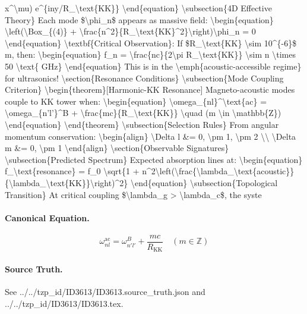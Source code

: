 x\textasciicircum{}\textbackslash{}mu) e\textasciicircum{}\{iny/R\_\textbackslash{}text\{KK\}\} \textbackslash{}end\{equation\} \textbackslash{}subsection\{4D Effective Theory\} Each mode \$\textbackslash{}phi\_n\$ appears as massive field: \textbackslash{}begin\{equation\} \textbackslash{}left(\textbackslash{}Box\_\{(4)\} + \textbackslash{}frac\{n\textasciicircum{}2\}\{R\_\textbackslash{}text\{KK\}\textasciicircum{}2\}\textbackslash{}right)\textbackslash{}phi\_n = 0 \textbackslash{}end\{equation\} \textbackslash{}textbf\{Critical Observation\}: If \$R\_\textbackslash{}text\{KK\} \textbackslash{}sim 10\textasciicircum{}\{-6\}\$ m, then: \textbackslash{}begin\{equation\} f\_n = \textbackslash{}frac\{nc\}\{2\textbackslash{}pi R\_\textbackslash{}text\{KK\}\} \textbackslash{}sim n \textbackslash{}times 50 \textbackslash{}text\{ GHz\} \textbackslash{}end\{equation\} This is in the \textbackslash{}emph\{acoustic-accessible regime\} for ultrasonics! \textbackslash{}section\{Resonance Conditions\} \textbackslash{}subsection\{Mode Coupling Criterion\} \textbackslash{}begin\{theorem\}[Harmonic-KK Resonance] Magneto-acoustic modes couple to KK tower when: \textbackslash{}begin\{equation\} \textbackslash{}omega\_\{nl\}\textasciicircum{}\textbackslash{}text\{ac\} = \textbackslash{}omega\_\{n'l'\}\textasciicircum{}B + \textbackslash{}frac\{mc\}\{R\_\textbackslash{}text\{KK\}\} \textbackslash{}quad (m \textbackslash{}in \textbackslash{}mathbb\{Z\}) \textbackslash{}end\{equation\} \textbackslash{}end\{theorem\} \textbackslash{}subsection\{Selection Rules\} From angular momentum conservation: \textbackslash{}begin\{align\} \textbackslash{}Delta l \&= 0, \textbackslash{}pm 1, \textbackslash{}pm 2 \textbackslash{}\textbackslash{} \textbackslash{}Delta m \&= 0, \textbackslash{}pm 1 \textbackslash{}end\{align\} \textbackslash{}section\{Observable Signatures\} \textbackslash{}subsection\{Predicted Spectrum\} Expected absorption lines at: \textbackslash{}begin\{equation\} f\_\textbackslash{}text\{resonance\} = f\_0 \textbackslash{}sqrt\{1 + n\textasciicircum{}2\textbackslash{}left(\textbackslash{}frac\{\textbackslash{}lambda\_\textbackslash{}text\{acoustic\}\}\{\textbackslash{}lambda\_\textbackslash{}text\{KK\}\}\textbackslash{}right)\textasciicircum{}2\} \textbackslash{}end\{equation\} \textbackslash{}subsection\{Topological Transition\} At critical coupling \$\textbackslash{}lambda\_g > \textbackslash{}lambda\_c\$, the syste

\paragraph{Canonical Equation.}
\[
\begin{equation} \omega_{nl}^\text{ac} = \omega_{n'l'}^B + \frac{mc}{R_\text{KK}} \quad (m \in \mathbb{Z}) \end{equation}
\]

\paragraph{Source Truth.}
See ../../tzp\_id/ID3613/ID3613.source\_truth.json and ../../tzp\_id/ID3613/ID3613.tex.
